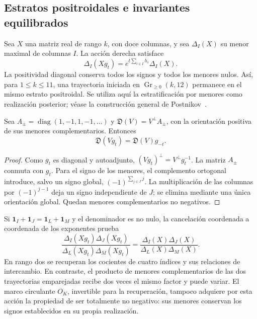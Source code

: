 \subsection{Estratos positroidales e invariantes equilibrados}

Sea \(X\) una matriz real de rango \(k\), con doce columnas, y sea \(\Delta_I(X)\) su menor maximal de columnas \(I\). La acción derecha satisface
\begin{equation}
 \Delta_I(Xg_t)=e^{t\sum_{i\in I}h_i}\Delta_I(X).
 \label{rec:eq:plucker}
\end{equation}
La positividad diagonal conserva todos los signos y todos los menores nulos. Así, para \(1\le k\le11\), una trayectoria iniciada en \(\operatorname{Gr}_{\ge0}(k,12)\) permanece en el mismo estrato positroidal. Se utiliza aquí la estratificación por menores como realización posterior; véase la construcción general de Postnikov~\cite{rec:postnikov}.

\begin{proposition}
Sea \(A_{\pm}=\operatorname{diag}(1,-1,1,-1,\ldots)\) y
\(\mathfrak D(V)=V^\perp A_{\pm}\), con la orientación positiva de sus menores complementarios. Entonces
\[
 \mathfrak D(Vg_t)=\mathfrak D(V)g_{-t}.
\]
\end{proposition}
\begin{proof}
Como \(g_t\) es diagonal y autoadjunto,
\((Vg_t)^\perp=V^\perp g_t^{-1}\). La matriz \(A_{\pm}\) conmuta con \(g_t\). Para el signo de los menores, el complemento ortogonal introduce, salvo un signo global, \((-1)^{\sum_{j\in J}j}\). La multiplicación de las columnas por \((-1)^{j-1}\) deja un signo independiente de \(J\); se elimina mediante una única orientación global. Quedan menores complementarios no negativos.
\end{proof}

Si \(\mathbf1_I+\mathbf1_J=\mathbf1_L+\mathbf1_M\) y el denominador es no nulo, la cancelación coordenada a coordenada de los exponentes prueba
\begin{equation}
 \frac{\Delta_I(Xg_t)\Delta_J(Xg_t)}{\Delta_L(Xg_t)\Delta_M(Xg_t)}
 =\frac{\Delta_I(X)\Delta_J(X)}{\Delta_L(X)\Delta_M(X)}.
 \label{rec:eq:cocientes}
\end{equation}
En rango dos se recuperan los cocientes de cuatro índices y sus relaciones de intercambio. En contraste, el producto de menores complementarios de las dos trayectorias emparejadas recibe dos veces el mismo factor y puede variar. El marco circulante \(O_K\), invertible para la recuperación, tampoco adquiere por esta acción la propiedad de ser totalmente no negativo: sus menores conservan los signos establecidos en su propia realización.

